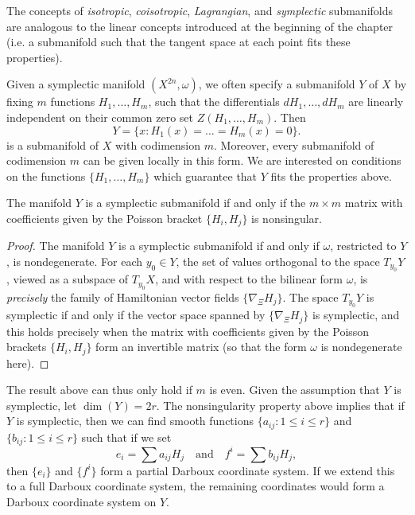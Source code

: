 The concepts of \emph{isotropic}, \emph{coisotropic}, \emph{Lagrangian}, and \emph{symplectic} submanifolds are analogous to the linear concepts introduced at the beginning of the chapter (i.e. a submanifold such that the tangent space at each point fits these properties).

Given a symplectic manifold $(X^{2n},\omega)$, we often specify a submanifold $Y$ of $X$ by fixing $m$ functions $H_1,\dots,H_m$, such that the differentials $dH_1,\dots,dH_m$ are linearly independent on their common zero set $Z(H_1,\dots,H_m)$. Then
%
\[ Y = \{ x: H_1(x) = \dots = H_m(x) = 0 \}. \]
%
is a submanifold of $X$ with codimension $m$. Moreover, every submanifold of codimension $m$ can be given locally in this form. We are interested on conditions on the functions $\{ H_1,\dots, H_m \}$ which guarantee that $Y$ fits the properties above.

\begin{theorem}
    The manifold $Y$ is a symplectic submanifold if and only if the $m \times m$ matrix with coefficients given by the Poisson bracket $\{ H_i, H_j \}$ is nonsingular.
\end{theorem}
\begin{proof}
    The manifold $Y$ is a symplectic submanifold if and only if $\omega$, restricted to $Y$, is nondegenerate. For each $y_0 \in Y$, the set of values orthogonal to the space $T_{y_0} Y$, viewed as a subspace of $T_{y_0} X$, and with respect to the bilinear form $\omega$, is \emph{precisely} the family of Hamiltonian vector fields $\{ \nabla_\Xi H_j \}$. The space $T_{y_0} Y$ is symplectic if and only if the vector space spanned by $\{ \nabla_\Xi H_j \}$ is symplectic, and this holds precisely when the matrix with coefficients given by the Poisson brackets $\{ H_i, H_j \}$ form an invertible matrix (so that the form $\omega$ is nondegenerate here).
\end{proof}

\begin{remark}
    The result above can thus only hold if $m$ is even. Given the assumption that $Y$ is symplectic, let $\dim(Y) = 2r$. The nonsingularity property above implies that if $Y$ is symplectic, then we can find smooth functions $\{ a_{ij} : 1 \leq i \leq r \}$ and $\{ b_{ij} : 1 \leq i \leq r \}$ such that if we set
    \[ e_i = \sum a_{ij} H_j \quad\text{and}\quad f^i = \sum b_{ij} H_j, \]
    then $\{ e_i \}$ and $\{ f^i \}$ form a partial Darboux coordinate system. If we extend this to a full Darboux coordinate system, the remaining coordinates would form a Darboux coordinate system on $Y$.
\end{remark}

